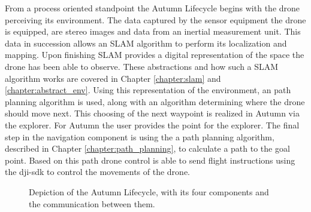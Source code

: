 From a process oriented standpoint the Autumn Lifecycle begins with the drone perceiving its environment. The data captured by the sensor equipment the drone is equipped, are stereo images and data from an inertial measurement unit. This data in succession allows an SLAM algorithm to perform its localization and mapping. Upon finishing SLAM provides a digital representation of the space the drone has been able to observe. These abstractions and how such a SLAM algorithm works are covered in Chapter \ref{chapter:slam} and \ref{chapter:abstract_env}. Using this representation of the environment, an path planning algorithm is used, along with an algorithm determining where the drone should move next. This choosing of the next waypoint is realized in Autumn via the explorer. For Autumn the user provides the point for the explorer. The final step in the navigation component is using the a path planning algorithm, described in Chapter \ref{chapter:path_planning}, to calculate a path to the goal point. Based on this path drone control is able to send flight instructions using the dji-sdk to control the movements of the drone.

\begin{figure}[h]
	\centering
	
	\caption{Depiction of the Autumn Lifecycle, with its four components and the communication between them.}
	\label{fig:autumnLifecycle}
\end{figure}


\filbreak